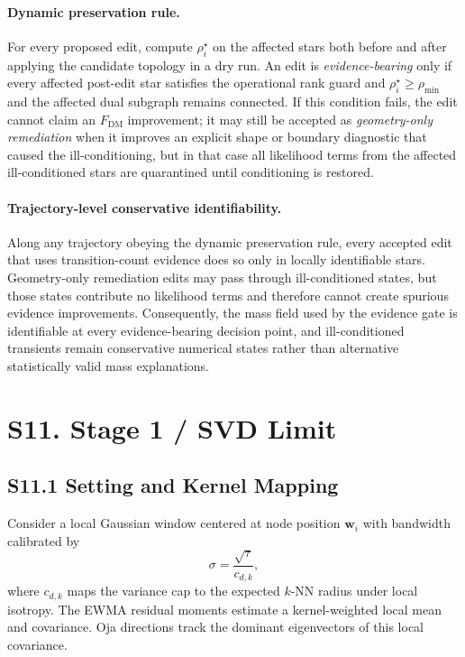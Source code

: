 \documentclass[11pt]{article}
\begin{document}
\paragraph{Dynamic preservation rule.}
For every proposed edit, compute $\rho_i^\star$ on the affected stars both before and after applying the candidate topology in a dry run. An edit is \emph{evidence-bearing} only if every affected post-edit star satisfies the operational rank guard and $\rho_i^\star\ge\rho_{\min}$ and the affected dual subgraph remains connected. If this condition fails, the edit cannot claim an $F_{\mathrm{DM}}$ improvement; it may still be accepted as \emph{geometry-only remediation} when it improves an explicit shape or boundary diagnostic that caused the ill-conditioning, but in that case all likelihood terms from the affected ill-conditioned stars are quarantined until conditioning is restored.

\paragraph{Trajectory-level conservative identifiability.}
Along any trajectory obeying the dynamic preservation rule, every accepted edit that uses transition-count evidence does so only in locally identifiable stars. Geometry-only remediation edits may pass through ill-conditioned states, but those states contribute no likelihood terms and therefore cannot create spurious evidence improvements. Consequently, the mass field used by the evidence gate is identifiable at every evidence-bearing decision point, and ill-conditioned transients remain conservative numerical states rather than alternative statistically valid mass explanations.

\section*{S11. Stage 1 / SVD Limit}

\subsection*{S11.1 Setting and Kernel Mapping}
Consider a local Gaussian window centered at node position $\mathbf w_i$ with bandwidth calibrated by
\[
\sigma=\frac{\sqrt{\tau}}{c_{d,k}},
\]
where $c_{d,k}$ maps the variance cap to the expected $k$-NN radius under local isotropy. The EWMA residual moments estimate a kernel-weighted local mean and covariance. Oja directions track the dominant eigenvectors of this local covariance.
\end{document}

